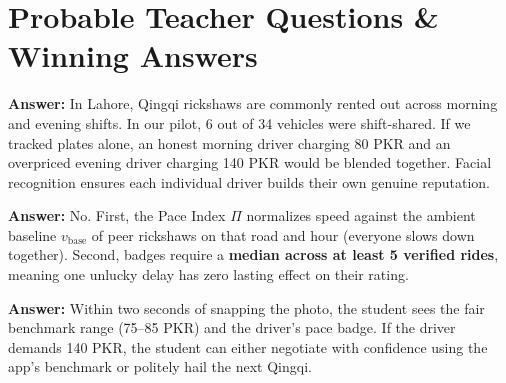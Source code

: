 \documentclass[10pt, a4paper]{article}
\begin{document}
\section{Probable Teacher Questions \& Winning Answers}

\begin{qa}
\footnotesize
\textbf{Answer:} In Lahore, Qingqi rickshaws are commonly rented out across morning and evening shifts. In our pilot, 6 out of 34 vehicles were shift-shared. If we tracked plates alone, an honest morning driver charging 80 PKR and an overpriced evening driver charging 140 PKR would be blended together. Facial recognition ensures each individual driver builds their own genuine reputation.
\end{qa}

\begin{qa}
\footnotesize
\textbf{Answer:} No. First, the Pace Index \(\Pi\) normalizes speed against the ambient baseline \(v_{\mathrm{base}}\) of peer rickshaws on that road and hour (everyone slows down together). Second, badges require a \textbf{median across at least 5 verified rides}, meaning one unlucky delay has zero lasting effect on their rating.
\end{qa}

\begin{qa}
\footnotesize
\textbf{Answer:} Within two seconds of snapping the photo, the student sees the fair benchmark range (75--85 PKR) and the driver's pace badge. If the driver demands 140 PKR, the student can either negotiate with confidence using the app's benchmark or politely hail the next Qingqi.
\end{qa}
\end{document}
